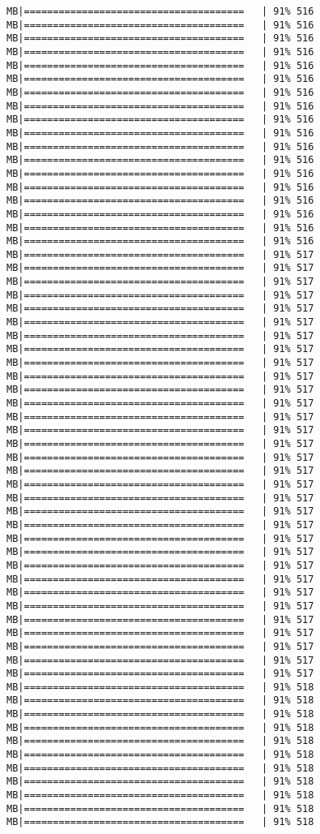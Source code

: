\documentclass[
]{article}
\begin{document}
\begin{verbatim}
MB|======================================   | 91% 516 MB|======================================   | 91% 516 MB|======================================   | 91% 516 MB|======================================   | 91% 516 MB|======================================   | 91% 516 MB|======================================   | 91% 516 MB|======================================   | 91% 516 MB|======================================   | 91% 516 MB|======================================   | 91% 516 MB|======================================   | 91% 516 MB|======================================   | 91% 516 MB|======================================   | 91% 516 MB|======================================   | 91% 516 MB|======================================   | 91% 516 MB|======================================   | 91% 516 MB|======================================   | 91% 516 MB|======================================   | 91% 516 MB|======================================   | 91% 516 MB|======================================   | 91% 517 MB|======================================   | 91% 517 MB|======================================   | 91% 517 MB|======================================   | 91% 517 MB|======================================   | 91% 517 MB|======================================   | 91% 517 MB|======================================   | 91% 517 MB|======================================   | 91% 517 MB|======================================   | 91% 517 MB|======================================   | 91% 517 MB|======================================   | 91% 517 MB|======================================   | 91% 517 MB|======================================   | 91% 517 MB|======================================   | 91% 517 MB|======================================   | 91% 517 MB|======================================   | 91% 517 MB|======================================   | 91% 517 MB|======================================   | 91% 517 MB|======================================   | 91% 517 MB|======================================   | 91% 517 MB|======================================   | 91% 517 MB|======================================   | 91% 517 MB|======================================   | 91% 517 MB|======================================   | 91% 517 MB|======================================   | 91% 517 MB|======================================   | 91% 517 MB|======================================   | 91% 517 MB|======================================   | 91% 517 MB|======================================   | 91% 517 MB|======================================   | 91% 517 MB|======================================   | 91% 517 MB|======================================   | 91% 517 MB|======================================   | 91% 518 MB|======================================   | 91% 518 MB|======================================   | 91% 518 MB|======================================   | 91% 518 MB|======================================   | 91% 518 MB|======================================   | 91% 518 MB|======================================   | 91% 518 MB|======================================   | 91% 518 MB|======================================   | 91% 518 MB|======================================   | 91% 518 MB|======================================   | 91% 518 
\end{verbatim}
\end{document}
